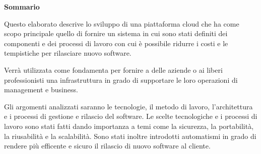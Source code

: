 \begin{center}
    \textbf{Sommario}
\end{center}
{\itshape{
    Questo elaborato descrive lo sviluppo di una piattaforma cloud che ha come scopo principale quello di fornire un sistema in cui sono stati definiti
    dei componenti e dei processi di lavoro con cui è possibile ridurre i costi e le tempistiche per rilasciare nuovo software.

    Verrà utilizzata come fondamenta per fornire a delle aziende o ai liberi
    professionisti una infrastruttura in grado di supportare le loro operazioni di management e business.

    Gli argomenti analizzati saranno le tecnologie, il metodo di lavoro, l'architettura e i processi di gestione e rilascio del software.
    Le scelte tecnologiche e i processi di lavoro sono stati fatti dando importanza a temi come la sicurezza, la portabilità, la riusabilità e la scalabilità.
    Sono stati inoltre introdotti automatismi in grado di rendere più efficente e sicuro il rilascio di nuovo software al cliente.
}}
